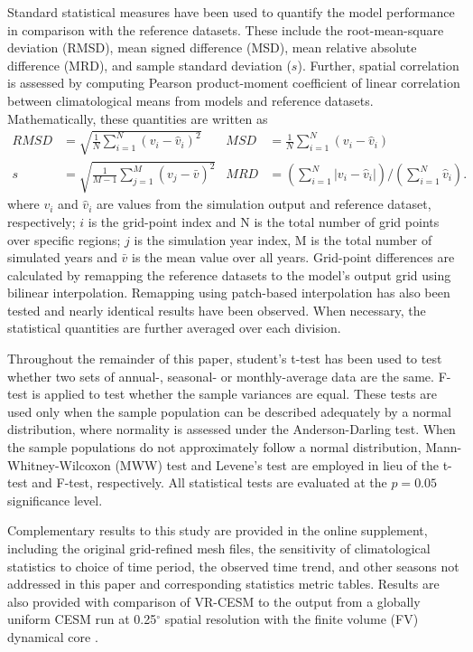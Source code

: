 \documentclass[draft,ms]{agutex}   %
\begin{document}
\begin{article}
Standard statistical measures have been used to quantify the model performance in comparison with the reference datasets. These include the root-mean-square deviation (RMSD), mean signed difference (MSD), mean relative absolute difference (MRD), and sample standard deviation ($s$). Further, spatial correlation is assessed by computing Pearson product-moment coefficient of linear correlation between climatological means from models and reference datasets.  Mathematically, these quantities are written as
\begin{align}
RMSD &= \sqrt{\frac{1}{N} \sum_{i=1}^{N} (v_i - \hat{v}_i)^2}  & MSD &= \frac{1}{N} \sum_{i=1}^{N} (v_i - \hat{v}_i) \\[2.0ex]
s &= \sqrt{\frac{1}{M-1} \sum_{j=1}^{M} (v_j - \bar{v})^2}   & MRD &= \left( \sum_{i=1}^{N} |v_i - \hat{v}_i| \right) \Bigg/ \left( \sum_{i=1}^{N} \hat{v}_i \right).
\end{align} where $v_i$ and $\hat{v}_i$ are values from the simulation output and reference dataset, respectively; $i$ is the grid-point index and N is the total number of grid points over specific regions; $j$ is the simulation year index, M is the total number of simulated years and $\bar{v}$ is the mean value over all years. Grid-point differences are calculated by remapping the reference datasets to the model's output grid using bilinear interpolation.  Remapping using patch-based interpolation has also been tested and nearly identical results have been observed.  When necessary, the statistical quantities are further averaged over each division.


Throughout the remainder of this paper, student's t-test has been used to test whether two sets of annual-, seasonal- or monthly-average data are the same. F-test is applied to test whether the sample variances are equal. These tests are used only when the sample population can be described adequately by a normal distribution, where normality is assessed under the Anderson-Darling test. When the sample populations do not approximately follow a normal distribution, Mann-Whitney-Wilcoxon (MWW) test and Levene's test are employed in lieu of the t-test and F-test, respectively. All statistical tests are evaluated at the $p = 0.05$ significance level.

Complementary results to this study are provided in the online supplement, including the original grid-refined mesh files, the sensitivity of climatological statistics to choice of time period, the observed time trend, and other seasons not addressed in this paper and corresponding statistics metric tables. Results are also provided with comparison of VR-CESM to the output from a globally uniform CESM run at 0.25$^\circ$ spatial resolution with the finite volume (FV) dynamical core \citep{wehner2014effect}.


\end{article}
\end{document}
